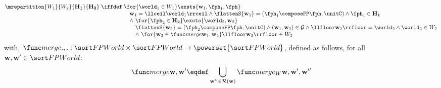 %
%
%
\begin{definition}[Repartitioning]
\[
	\mrepartition{W_1 }{W_2}{\mathbf{H_1}}{\mathbf{H_2}} \; \iffdef \;
	\begin{array}[t]{@{} l @{}}
		\for{\world_1 \in W_1} \exsts{\fpw_1, \fph_1, \fph}\\
		\quad \fpw_1 = \lift{\world_1} \land \flattenS{\fpw_1} = (\fph_1 \composeFP \fph, \unitC) \land \fph_1 \in \mathbf{H_1} \\
		\quad \land\ \for{\fph_2 \in \mathbf{H_2}} \exsts{\world_2, \fpw_2} \\
		\qquad \flattenS{\fpw_2} = (\fph_2 \composeFP \fph, \unitC) \land (\fpw_1, \fpw_2) \in \myguar \land \erase{\fpw_2} = \world_2 \land \world_2 \in W_2 \\
		\qquad \land\ \for{\fpw_3 \in \mergeW{\fpw_1}{\fpw_2}} \erase{\fpw_3} \in W_2
	\end{array}
\]
with, $\mergeW{.}{.}: \FPWorlds \times \FPWorlds \rightarrow \powerset{\FPWorlds}$, defined as follows, for all $\fpw, \fpw' \in \FPWorlds$:
%
\[
	\mergeW{\fpw}{\fpw'} \eqdef \bigcup\limits_{\fpw'' \in \myrely(\fpw)} \mergeWAux{\fpw}{\fpw'}{\fpw''}
\]
%
\end{definition}
